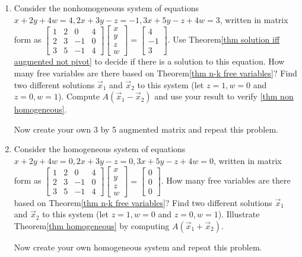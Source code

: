 \begin{enumerate}
\begin{enumerate}
	\item Consider the nonhomogeneous system of equations $x+2y+4w=4, 2x+3y-z=-1, 3x+5y-z+4w=3$, written in matrix form as 
	$
	\begin{bmatrix}
	1 & 2 & 0 & 4 \\
	2 & 3 & -1 & 0\\
	3 & 5 & -1 & 4	
	\end{bmatrix}
	\begin{bmatrix}
	x\\y\\z\\w	
	\end{bmatrix}
	=\begin{bmatrix}
	 4\\
	 -1\\
	 3	
	\end{bmatrix}
	$.  
	Use Theorem\ref{thm solution iff augmented not pivot} to decide if there is a solution to this equation. 
	How many free variables are there based on Theorem\ref{thm n-k free variables}? 
	Find two different solutions $\vec x_1$ and $\vec x_2$ to this system (let $z=1,w=0$ and $z=0,w=1$).  
	Compute $A(\vec x_1 - \vec x_2)$ and use your result to verify \ref{thm non homogeneous}. 
	
	Now create your own 3 by 5 augmented matrix and repeat this problem. 
	
	\item Consider the homogeneous system of equations $x+2y+4w=0, 2x+3y-z=0, 3x+5y-z+4w=0$, written in matrix form as 
	$
	\begin{bmatrix}
	1 & 2 & 0 & 4 \\
	2 & 3 & -1 & 0\\
	3 & 5 & -1 & 4	
	\end{bmatrix}
	\begin{bmatrix}
	x\\y\\z\\w	
	\end{bmatrix}
	=\begin{bmatrix}
	 0\\
	 0\\
	 0	
	\end{bmatrix}
	$.  
	How many free variables are there based on Theorem\ref{thm n-k free variables}?
	Find two different solutions $\vec x_1$ and $\vec x_2$ to this system (let $z=1,w=0$ and $z=0,w=1$).  
	Illustrate Theorem\ref{thm homogeneous} by computing $A(\vec x_1 + \vec x_2)$. 
	
	Now create your own homogeneous system and repeat this problem. 	
	

\end{enumerate}
\end{enumerate}
